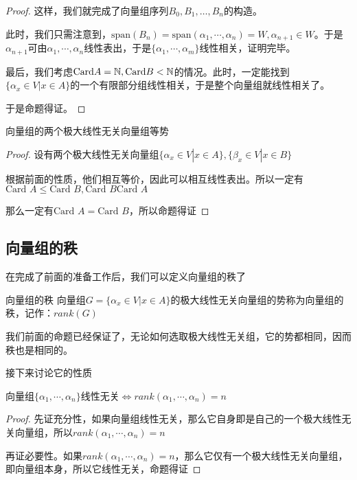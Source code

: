 \documentclass[12pt, a4paper, oneside, UTF8]{ctexbook}
\begin{document}
\begin{para}{0}
\begin{proof}
						这样，我们就完成了向量组序列$B_0, B_1, \dots, B_n$的构造。
						
						此时，我们只需注意到，$\text{span}(B_n)=\text{span}(\alpha_1,\cdots,\alpha _n)=W,\alpha_{n+1} \in W$。于是$\alpha_{n+1}$可由$\alpha_1,\cdots,\alpha_n$线性表出，于是$\{\alpha_1,\cdots,\alpha_m\}$线性相关，证明完毕。

						最后，我们考虑$\text{Card} A = \mathbb{N},\text{Card} B < \mathbb{N}$的情况。此时，一定能找到$\{\alpha_x \in V | x \in A\}$的一个有限部分组线性相关，于是整个向量组就线性相关了。

						于是命题得证。
					\end{proof}
					\begin{proposition}
						向量组的两个极大线性无关向量组等势
					\end{proposition}
					\begin{proof}
						设有两个极大线性无关向量组$\{\alpha_x \in V| x\in A\},\{\beta_x \in V| x \in B\}$

						根据前面的性质，他们相互等价，因此可以相互线性表出。所以一定有$\text{Card }A \leqslant \text{Card }B,\text{Card }B \text{Card }A$

						那么一定有$\text{Card }A = \text{Card }B$，所以命题得证
					\end{proof}
			\end{para}
		\subsection{向量组的秩}
			在完成了前面的准备工作后，我们可以定义向量组的秩了
			\begin{defn}{向量组的秩}{}
				向量组$G=\{\alpha_x \in V| x \in A\}$的极大线性无关向量组的势称为向量组的秩，记作：$rank(G)$
			\end{defn}
			我们前面的命题已经保证了，无论如何选取极大线性无关组，它的势都相同，因而秩也是相同的。
			
			接下来讨论它的性质
			\begin{para}{0}
				\point{}
					\begin{proposition}
						向量组$\{\alpha_1,\cdots,\alpha_n\}$线性无关$\Leftrightarrow rank(\alpha_1,\cdots,\alpha_n)=n$
					\end{proposition}
					\begin{proof}
						先证充分性，如果向量组线性无关，那么它自身即是自己的一个极大线性无关向量组，所以$rank(\alpha_1,\cdots,\alpha_n)=n$

						再证必要性。如果$rank(\alpha_1,\cdots,\alpha_n)=n$，那么它仅有一个极大线性无关向量组，即向量组本身，所以它线性无关，命题得证
					\end{proof}
			\end{para}
\end{document}
